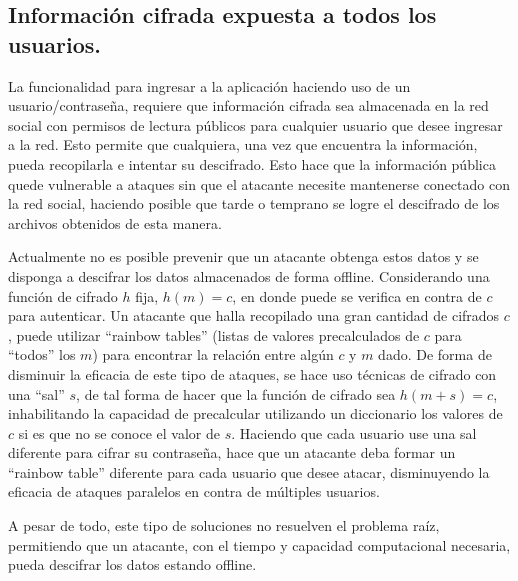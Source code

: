   \subsection{Información cifrada expuesta a todos los usuarios.}
      La funcionalidad para ingresar a la aplicación haciendo uso de un
      usuario/contraseña, requiere que información cifrada sea almacenada en la
      red social con permisos de lectura públicos para cualquier usuario que desee
      ingresar a la red. Esto permite que cualquiera, una vez que encuentra la
      información, pueda recopilarla e intentar su descifrado. Esto hace que
      la información pública quede vulnerable a ataques sin
      que el atacante necesite mantenerse conectado con la red social, haciendo
      posible que tarde o temprano se logre el descifrado de los archivos
      obtenidos de esta manera.

      Actualmente no es posible prevenir que un atacante obtenga estos
      datos y se disponga a descifrar los datos almacenados de forma
      offline.
      Considerando una función de cifrado $h$ fija, $ h(m) = c$,  en donde  puede se verifica en
      contra de $c$ para autenticar. Un atacante
      que halla recopilado una gran cantidad de cifrados $c$, puede utilizar
      ``rainbow tables'' (listas de valores precalculados de
      $c$ para ``todos'' los $m$) para encontrar la relación entre algún $c$ y
      $m$ dado.
      De forma de disminuir la eficacia de este tipo de ataques, se hace uso
      técnicas de cifrado con una ``sal'' $s$, de tal forma de hacer que la función
      de cifrado sea $h(m+s) = c$, inhabilitando la capacidad de precalcular
      utilizando un diccionario los valores de $c$ si es que no se conoce el
      valor de $s$. Haciendo que cada usuario use una sal diferente para cifrar
      su contraseña, hace que un atacante deba formar un ``rainbow table''
      diferente para cada usuario que desee atacar, disminuyendo la
      eficacia de ataques paralelos en contra de múltiples usuarios.

      A pesar de todo, este tipo de soluciones no resuelven el problema raíz,
      permitiendo que un atacante, con el tiempo y capacidad computacional
      necesaria, pueda descifrar los datos estando offline.

